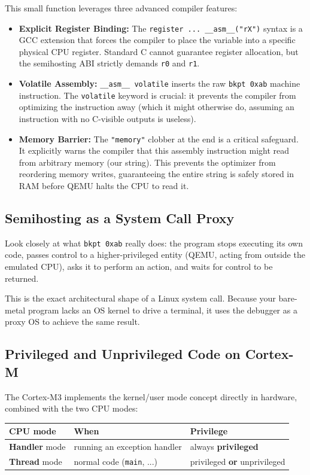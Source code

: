 This small function leverages three advanced compiler features:
\begin{itemize}
    \item \textbf{Explicit Register Binding:} The \texttt{register ... \_\_asm\_\_("rX")} syntax is a GCC extension that forces the compiler to place the variable into a specific physical CPU register. Standard C cannot guarantee register allocation, but the semihosting ABI strictly demands \texttt{r0} and \texttt{r1}.
    \item \textbf{Volatile Assembly:} \texttt{\_\_asm\_\_ volatile} inserts the raw \texttt{bkpt 0xab} machine instruction. The \texttt{volatile} keyword is crucial: it prevents the compiler from optimizing the instruction away (which it might otherwise do, assuming an instruction with no C-visible outputs is useless).
    \item \textbf{Memory Barrier:} The \texttt{"memory"} clobber at the end is a critical safeguard. It explicitly warns the compiler that this assembly instruction might read from arbitrary memory (our string). This prevents the optimizer from reordering memory writes, guaranteeing the entire string is safely stored in RAM before QEMU halts the CPU to read it.
\end{itemize}

\subsection{Semihosting as a System Call Proxy}
Look closely at what \texttt{bkpt 0xab} really does: the program stops executing its own code, passes control to a higher-privileged entity (QEMU, acting from outside the emulated CPU), asks it to perform an action, and waits for control to be returned.

This is the exact architectural shape of a Linux system call. Because your bare-metal program lacks an OS kernel to drive a terminal, it uses the debugger as a proxy OS to achieve the same result.

\subsection{Privileged and Unprivileged Code on Cortex-M}
The Cortex-M3 implements the kernel/user mode concept directly in hardware, combined with the two CPU modes:

\begin{table}[h!]
\centering
\begin{tabular}{|l|l|l|}
\hline
\textbf{CPU mode} & \textbf{When} & \textbf{Privilege} \\ \hline
\textbf{Handler} mode & running an exception handler & always \textbf{privileged} \\ \hline
\textbf{Thread} mode & normal code (\texttt{main}, ...) & privileged \textbf{or} unprivileged \\ \hline
\end{tabular}
\end{table}

